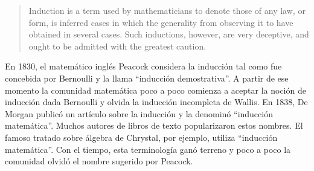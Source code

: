 \begin{quote}
	Induction is a term used by mathematicians to denote those of any law, or
	form, is inferred cases in which the generality from observing it to have
	obtained in several cases. Such inductions, however, are very deceptive,
	and ought to be admitted with the greatest caution.
\end{quote}
En 1830, el matemático inglés Peacock considera la inducción tal como fue
concebida por Bernoulli y la llama ``inducción demostrativa''. A partir de ese
momento la comunidad matemática poco a poco comienza a aceptar la noción de
inducción dada Bernoulli y olvida la inducción incompleta de Wallis.  En 1838,
De Morgan publicó un artículo sobre la inducción y la denominó ``inducción
matemática''. Muchos autores de libros de texto popularizaron estos nombres.
El famoso tratado sobre álgebra de Chrystal, por ejemplo, utiliza ``inducción
matemática''. Con el tiempo, esta terminología ganó terreno y poco a poco la
comunidad olvidó el nombre sugerido por Peacock. 


%
%
%
%
%
%
